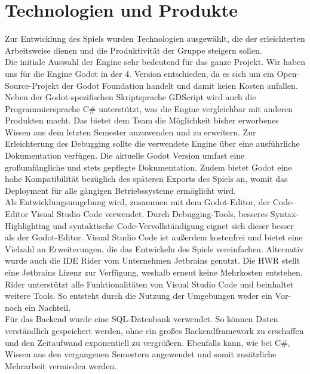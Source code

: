 \chapter{Technologien und Produkte}\label{ch:technologien}
Zur Entwicklung des Spiels wurden Technologien ausgewählt, die der erleichterten Arbeitsweise dienen
und die Produktivität der Gruppe steigern sollen. \\
\newline
Die initiale Auswahl der Engine sehr bedeutend für das ganze Projekt. 
Wir haben uns für die Engine Godot in der 4. Version entschieden, da es sich um ein Open-Source-Projekt der Godot 
Foundation handelt und damit keien Kosten anfallen.
Neben der Godot-spezifischen Skriptsprache GDScript wird auch die Programmiersprache C\# unterstützt, was die Engine vergleichbar mit anderen Produkten macht.
Das bietet dem Team die Möglichkeit bisher erworbenes Wissen aus dem 
letzten Semester anzuwenden und zu erweitern.
Zur Erleichterung des Debugging sollte die verwendete Engine über eine ausführliche Dokumentation verfügen. 
Die aktuelle Godot Version umfast eine großumfängliche und stets gepflegte Dokumentation.
Zudem bietet Godot eine hohe Kompatibilität bezüglich des späteren Exports des Spiels an, womit das 
Deployment für alle gängigen Betriebssysteme ermöglicht wird. \\
\newline
Als Entwicklungsumgebung wird, zusammen mit dem Godot-Editor, der Code-Editor Visual Studio Code verwendet. 
Durch Debugging-Tools, besseres Syntax-Highlighting und syntaktische Code-Vervollständigung eignet sich dieser besser als der Godot-Editor.
Visual Studio Code ist außerdem kostenfrei und bietet eine Vielzahl an Erweiterungen, die das Entwickeln des Spiels
vereinfachen.
Alternativ wurde auch die IDE Rider vom Unternehmen Jetbrains genutzt.
Die HWR stellt eine Jetbrains Lizenz zur Verfügung, weshalb erneut keine Mehrkosten entstehen.
Rider unterstützt alle Funktionalitäten von Visual Studio Code und beinhaltet weitere Tools. So entsteht durch die Nutzung der Umgebungen weder ein Vor- noch ein Nachteil.\\
\newline
Für das Backend wurde eine SQL-Datenbank verwendet.
So können Daten verständlich gespeichert werden, ohne ein großes Backendframework
zu erschaffen und den Zeitaufwand exponentiell zu vergrößern. 
Ebenfalls kann, wie bei C\#, Wissen aus den vergangenen Semestern angewendet und somit zusätzliche 
Mehrarbeit vermieden werden. \\
